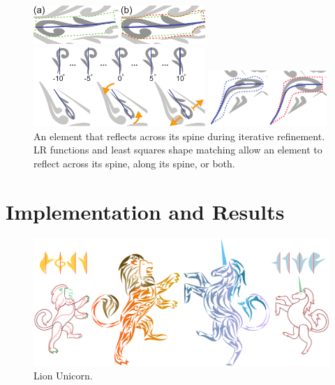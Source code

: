 \begin{figure}[t]
\centering
\includegraphics[width=6.5cm]{figures/flowpak/stretch.pdf}
\caption[Enlarge an element]
{\label{stretch_ornament}
(a) An element with its sub-region blob shown in dashed green line. Note that any blob is constrained by the neighboring elements. 
(b) The dashed red line is the grown blob, which accommodates an enlarged element.}

\medskip
\includegraphics[width=6.5cm]{figures/flowpak/rotate_ornament.pdf}
\caption[Rotate an element]
{\label{rotate_ornament}
Top row: rotated versions of the original element. 
         The best rotation angle is chosen via least squares matching.
         Bottom row: original, rotated, and enlarged versions of an element.}

\medskip
\includegraphics[width=4.5cm]{figures/flowpak/flip.pdf}
\caption[Flip an element]
{\label{flip_shape}
An element that reflects across its spine during iterative refinement.
LR functions and least squares shape matching allow an element to reflect
across its spine, along its spine, or both.}
\end{figure}

\section{Implementation and Results}

\begin{figure}
\centering
\includegraphics[width=1.0\textwidth]{figures/flowpak/lion_unicorn.pdf} 
\caption[A packing of lion and unicorn]
{\label{fig_lion_unicorn} 
Lion Unicorn. }
\end{figure}

